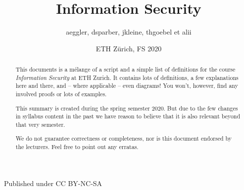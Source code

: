 \documentclass[paper=a4, parskip=half-]{scrartcl}
\title{Information Security}
\author{aeggler, dsparber, jkleine, thgoebel et alii}
\date{ETH Zürich, FS 2020}
\begin{document}
\begin{titlepage}
\maketitle
\vspace{5cm}
\thispagestyle{empty}


\begin{abstract}
This documents is a mélange of a script and a simple list of definitions for the course \textit{Information Security} at ETH Zurich. It contains lots of definitions, a few explanations here and there, and -- where applicable -- even diagrams! You won't, however, find any involved proofs or lots of examples.

This summary is created during the spring semester 2020. But due to the few changes in syllabus content in the past we have reason to believe that it is also relevant beyond that very semester.

We do not guarantee correctness or completeness, nor is this document endorsed by the lecturers. Feel free to point out any erratas.
\end{abstract}

\begin{center}
\vfill
Published under CC BY-NC-SA \\
\vspace{0.2cm}
\ccbyncsa
\end{center}
\end{titlepage}

\tableofcontents
\newpage


\newpage


\newpage


\end{document}
